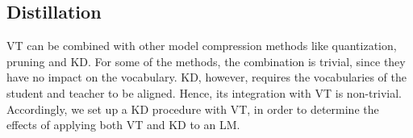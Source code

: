 \documentclass[11pt]{article}
\begin{document}
  
  
  



\subsection{Distillation}
VT can be combined with other model compression methods like quantization, pruning and KD. For some of the methods, the combination is trivial, since they have no impact on the vocabulary. KD, however, requires the vocabularies of the student and teacher to be aligned. Hence, its integration with VT is non-trivial. Accordingly, we set up a KD procedure with VT, in order
to determine the effects of applying both VT and KD to an LM. 
\end{document}
